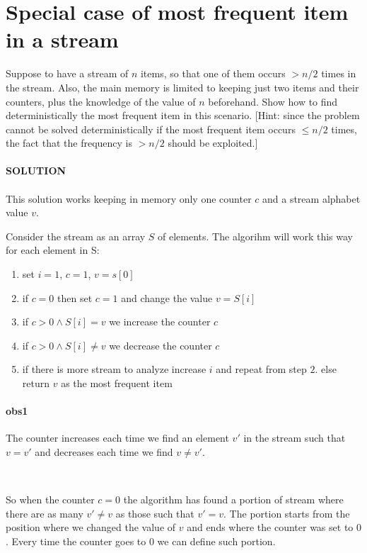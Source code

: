 \documentclass[a4paper]{article}
\begin{document}
\section*{Special case of most frequent item in a stream}
Suppose to have a stream of $n$ items, so that one of them occurs $> n/2$ times in the stream. Also, the main memory is limited to keeping just two items and their counters, plus the knowledge of the value of $n$ beforehand. Show how to find deterministically the most frequent item in this scenario. [Hint: since the problem cannot be solved deterministically if the most frequent item occurs $\leq n/2$ times, the fact that the frequency is $> n/2$ should be exploited.]
\\
\\
\textbf{SOLUTION}
\\
\\
This solution works keeping in memory only one counter \textbf{$c$} and a stream alphabet value \textbf{$v$}.

\noindent 
Consider the stream as an array $S$ of elements.
The algorihm will work this way for each element in S:
\begin{enumerate}
\item set $i = 1$, $c = 1$, $v = s[0]$
\item if $c = 0$ then set $c = 1$ and change the value $v = S[i]$
\item if $c>0 \land S[i] = v$  we increase the counter $c$ 
\item if $c>0 \land S[i] \neq v$ we decrease the counter $c$
\item if there is more stream to analyze increase $i$ and repeat from step $2.$ else return $v$ as the most frequent item
\end{enumerate} 


\paragraph{obs1} 
The counter increases each time we find an element $v'$ in the stream such that $v = v'$ and decreases each time we find $v \neq v'$.

\

So when the counter $c = 0$  the algorithm has found a portion of stream where there are as many $v' \neq v$ as those such that $v' = v$.
The portion starts from the position where we changed the value of $v$ and ends where the counter was set to $0$.
Every time the counter goes to $0$ we can define such portion. 
\end{document}
